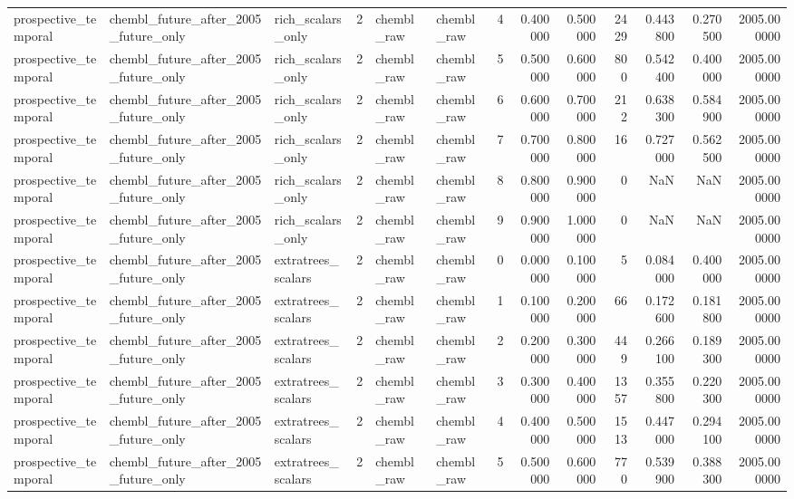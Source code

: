 \begin{longtable}{lllrllrrrrrrr}
prospective\_temporal & chembl\_future\_after\_2005\_future\_only & rich\_scalars\_only & 2 & chembl\_raw & chembl\_raw & 4 & 0.400000 & 0.500000 & 2429 & 0.443800 & 0.270500 & 2005.000000 \\
prospective\_temporal & chembl\_future\_after\_2005\_future\_only & rich\_scalars\_only & 2 & chembl\_raw & chembl\_raw & 5 & 0.500000 & 0.600000 & 800 & 0.542400 & 0.400000 & 2005.000000 \\
prospective\_temporal & chembl\_future\_after\_2005\_future\_only & rich\_scalars\_only & 2 & chembl\_raw & chembl\_raw & 6 & 0.600000 & 0.700000 & 212 & 0.638300 & 0.584900 & 2005.000000 \\
prospective\_temporal & chembl\_future\_after\_2005\_future\_only & rich\_scalars\_only & 2 & chembl\_raw & chembl\_raw & 7 & 0.700000 & 0.800000 & 16 & 0.727000 & 0.562500 & 2005.000000 \\
prospective\_temporal & chembl\_future\_after\_2005\_future\_only & rich\_scalars\_only & 2 & chembl\_raw & chembl\_raw & 8 & 0.800000 & 0.900000 & 0 & NaN & NaN & 2005.000000 \\
prospective\_temporal & chembl\_future\_after\_2005\_future\_only & rich\_scalars\_only & 2 & chembl\_raw & chembl\_raw & 9 & 0.900000 & 1.000000 & 0 & NaN & NaN & 2005.000000 \\
prospective\_temporal & chembl\_future\_after\_2005\_future\_only & extratrees\_scalars & 2 & chembl\_raw & chembl\_raw & 0 & 0.000000 & 0.100000 & 5 & 0.084000 & 0.400000 & 2005.000000 \\
prospective\_temporal & chembl\_future\_after\_2005\_future\_only & extratrees\_scalars & 2 & chembl\_raw & chembl\_raw & 1 & 0.100000 & 0.200000 & 66 & 0.172600 & 0.181800 & 2005.000000 \\
prospective\_temporal & chembl\_future\_after\_2005\_future\_only & extratrees\_scalars & 2 & chembl\_raw & chembl\_raw & 2 & 0.200000 & 0.300000 & 449 & 0.266100 & 0.189300 & 2005.000000 \\
prospective\_temporal & chembl\_future\_after\_2005\_future\_only & extratrees\_scalars & 2 & chembl\_raw & chembl\_raw & 3 & 0.300000 & 0.400000 & 1357 & 0.355800 & 0.220300 & 2005.000000 \\
prospective\_temporal & chembl\_future\_after\_2005\_future\_only & extratrees\_scalars & 2 & chembl\_raw & chembl\_raw & 4 & 0.400000 & 0.500000 & 1513 & 0.447000 & 0.294100 & 2005.000000 \\
prospective\_temporal & chembl\_future\_after\_2005\_future\_only & extratrees\_scalars & 2 & chembl\_raw & chembl\_raw & 5 & 0.500000 & 0.600000 & 770 & 0.539900 & 0.388300 & 2005.000000 \\

\end{longtable}
